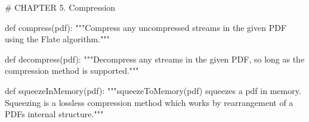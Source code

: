 # CHAPTER 5. Compression

def compress(pdf):
    """Compress any uncompressed streams in the given PDF using the Flate
    algorithm."""

def decompress(pdf):
    """Decompress any streams in the given PDF, so long as the compression
    method is supported."""

def squeezeInMemory(pdf):
    """squeezeToMemory(pdf) squeezes a pdf in memory. Squeezing is a lossless
    compression method which works by rearrangement of a PDFs internal
    structure."""
